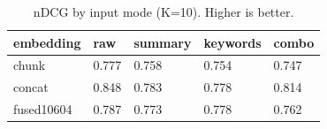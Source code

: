 \begin{table}
\caption{nDCG by input mode (K=10). Higher is better.}
\label{tab:ndcg-by-mode}
\begin{tabular}{lllll}
\toprule
embedding & raw & summary & keywords & combo \\
\midrule
chunk & 0.777 & 0.758 & 0.754 & 0.747 \\
concat & 0.848 & 0.783 & 0.778 & 0.814 \\
fused10604 & 0.787 & 0.773 & 0.778 & 0.762 \\
\bottomrule
\end{tabular}
\end{table}
